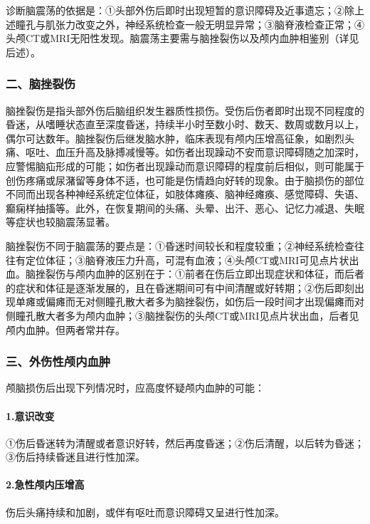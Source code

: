 诊断脑震荡的依据是：①头部外伤后即时出现短暂的意识障碍及近事遗忘；②除上述瞳孔与肌张力改变之外，神经系统检查一般无明显异常；③脑脊液检查正常；④头颅CT或MRI无阳性发现。脑震荡主要需与脑挫裂伤以及颅内血肿相鉴别（详见后述）。

\subsubsection{二、脑挫裂伤}

脑挫裂伤是指头部外伤后脑组织发生器质性损伤。受伤后伤者即时出现不同程度的昏迷，从嗜睡状态直至深度昏迷，持续半小时至数小时、数天、数周或数月以上，偶尔可达数年。脑挫裂伤后继发脑水肿，临床表现有颅内压增高征象，如剧烈头痛、呕吐、血压升高及脉搏减慢等。如伤者出现躁动不安而意识障碍随之加深时，应警惕脑疝形成的可能；如伤者出现躁动而意识障碍的程度前后相似，则可能属于创伤疼痛或尿潴留等身体不适，也可能是伤情趋向好转的现象。由于脑损伤的部位不同而出现各种神经系统定位体征，如肢体瘫痪、脑神经瘫痪、感觉障碍、失语、癫痫样抽搐等。此外，在恢复期间的头痛、头晕、出汗、恶心、记忆力减退、失眠等症状也较脑震荡显著。

脑挫裂伤不同于脑震荡的要点是：①昏迷时间较长和程度较重；②神经系统检查往往有定位体征；③脑脊液压力升高，可混有血液；④头颅CT或MRI可见点片状出血。脑挫裂伤与颅内血肿的区别在于：①前者在伤后立即出现症状和体征，而后者的症状和体征是逐渐发展的，且在昏迷期间可有中间清醒或好转期；②伤后即刻出现单瘫或偏瘫而无对侧瞳孔散大者多为脑挫裂伤，如伤后一段时间才出现偏瘫而对侧瞳孔散大者多为颅内血肿；③脑挫裂伤的头颅CT或MRI见点片状出血，后者见颅内血肿。但两者常并存。

\subsubsection{三、外伤性颅内血肿}

颅脑损伤后出现下列情况时，应高度怀疑颅内血肿的可能：

\paragraph{1.意识改变}

①伤后昏迷转为清醒或者意识好转，然后再度昏迷；②伤后清醒，以后转为昏迷；③伤后持续昏迷且进行性加深。

\paragraph{2.急性颅内压增高}

伤后头痛持续和加剧，或伴有呕吐而意识障碍又呈进行性加深。


